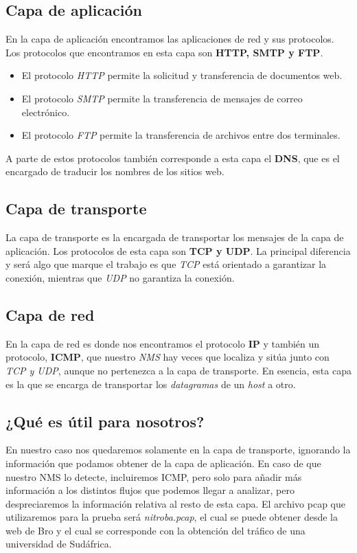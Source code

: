\subsection{Capa de aplicación}

En la capa de aplicación encontramos las aplicaciones de red y sus protocolos. 
Los protocolos que encontramos en esta capa son \textbf{HTTP, SMTP y FTP}. 
\intro
\begin{itemize}
\item El protocolo \textit{HTTP} permite la solicitud y transferencia de documentos web.
\item El protocolo \textit{SMTP} permite la transferencia de mensajes de correo electrónico.
\item El protocolo \textit{FTP} permite la transferencia de archivos entre dos terminales.
\end{itemize}

\noindent A parte de estos protocolos también corresponde a esta capa el \textbf{DNS}, 
que es el encargado de traducir los nombres de los sitios web.

\subsection{Capa de transporte}

La capa de transporte es la encargada de transportar los mensajes de la capa de aplicación. 
Los protocolos de esta capa son \textbf{TCP y UDP}. La principal diferencia y será algo que 
marque el trabajo es que \textit{TCP} está orientado a garantizar la conexión, mientras que \textit{UDP} no 
garantiza la conexión.

\subsection{Capa de red}

En la capa de red es donde nos encontramos el protocolo \textbf{IP} y también 
un protocolo, \textbf{ICMP}, que nuestro \textit{NMS} hay veces que localiza y 
sitúa junto con \textit{TCP y UDP}, aunque no pertenezca a la capa de transporte.
\intro
En esencia, esta capa es la que se encarga de transportar los \textit{datagramas} 
de un \textit{host} a otro.

\subsection{¿Qué es útil para nosotros?}

En nuestro caso nos quedaremos solamente en la capa de transporte, 
ignorando la información que podamos obtener de la capa 
de aplicación. En caso de que nuestro NMS lo detecte, incluiremos ICMP, 
pero solo para añadir más 
información a los distintos flujos que podemos llegar a analizar, 
pero despreciaremos la información relativa al resto de esta capa. 
El archivo pcap que utilizaremos para la prueba será \textit{nitroba.pcap}, 
el cual se puede obtener desde la web de Bro y el cual se corresponde con 
la obtención del tráfico de una universidad de Sudáfrica.
